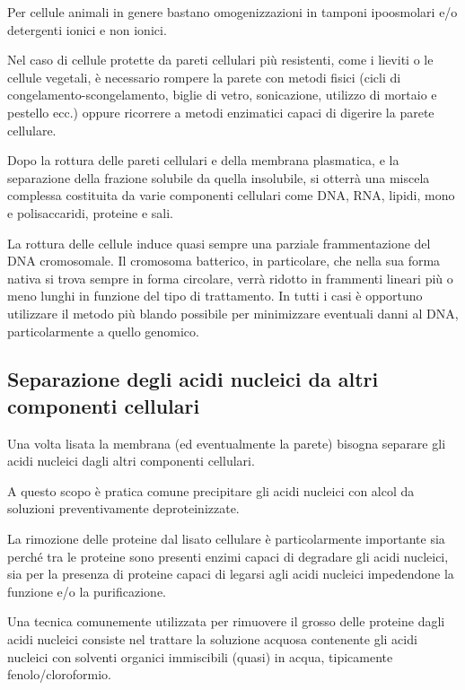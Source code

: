 \documentclass[11pt]{book}
\begin{document}
Per cellule animali in genere bastano omogenizzazioni in tamponi
ipoosmolari e/o detergenti ionici e non ionici.

Nel caso di cellule protette da pareti cellulari più resistenti, come i
lieviti o le cellule vegetali, è necessario rompere la parete con metodi
fisici (cicli di congelamento-scongelamento, biglie di vetro,
sonicazione, utilizzo di mortaio e pestello ecc.) oppure ricorrere a
metodi enzimatici capaci di digerire la parete cellulare.

Dopo la rottura delle pareti cellulari e della membrana plasmatica, e la
separazione della frazione solubile da quella insolubile, si otterrà una
miscela complessa costituita da varie componenti cellulari come DNA,
RNA, lipidi, mono e polisaccaridi, proteine e sali.

La rottura delle cellule induce quasi sempre una parziale frammentazione
del DNA cromosomale. Il cromosoma batterico, in particolare, che nella
sua forma nativa si trova sempre in forma circolare, verrà ridotto in
frammenti lineari più o meno lunghi in funzione del tipo di trattamento.
In tutti i casi è opportuno utilizzare il metodo più blando possibile
per minimizzare eventuali danni al DNA, particolarmente a quello
genomico.

\subsection{Separazione degli acidi nucleici da altri componenti
cellulari}\label{separazione-degli-acidi-nucleici-da-altri-componenti-cellulari}

Una volta lisata la membrana (ed eventualmente la parete) bisogna
separare gli acidi nucleici dagli altri componenti cellulari.

A questo scopo è pratica comune precipitare gli acidi nucleici con alcol
da soluzioni preventivamente deproteinizzate.

La rimozione delle proteine dal lisato cellulare è particolarmente
importante sia perché tra le proteine sono presenti enzimi capaci di
degradare gli acidi nucleici, sia per la presenza di proteine capaci di
legarsi agli acidi nucleici impedendone la funzione e/o la
purificazione.

Una tecnica comunemente utilizzata per rimuovere il grosso delle
proteine dagli acidi nucleici consiste nel trattare la soluzione acquosa
contenente gli acidi nucleici con solventi organici immiscibili (quasi)
in acqua, tipicamente fenolo/cloroformio.
\end{document}
